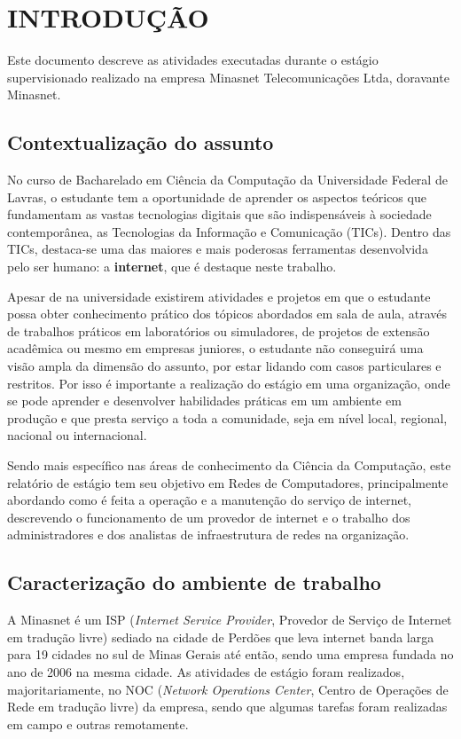 \chapter{INTRODUÇÃO}

    Este documento descreve as atividades executadas durante o estágio supervisionado realizado na empresa Minasnet Telecomunicações Ltda, doravante Minasnet.

\section{Contextualização do assunto}

    No curso de Bacharelado em Ciência da Computação da Universidade Federal de Lavras, o estudante tem a oportunidade de aprender os aspectos teóricos que fundamentam as vastas tecnologias digitais que são indispensáveis à sociedade contemporânea, as Tecnologias da Informação e Comunicação (TICs). Dentro das TICs, destaca-se uma das maiores e mais poderosas ferramentas desenvolvida pelo ser humano: a \textbf{internet}, que é destaque neste trabalho.

    Apesar de na universidade existirem atividades e projetos em que o estudante possa obter conhecimento prático dos tópicos abordados em sala de aula, através de trabalhos práticos em laboratórios ou simuladores, de projetos de extensão acadêmica ou mesmo em empresas juniores, o estudante não conseguirá uma visão ampla da dimensão do assunto, por estar lidando com casos particulares e restritos. Por isso é importante a realização do estágio em uma organização, onde se pode aprender e desenvolver habilidades práticas em um ambiente em produção e que presta serviço a toda a comunidade, seja em nível local, regional, nacional ou internacional.
    
    Sendo mais específico nas áreas de conhecimento da Ciência da Computação, este relatório de estágio tem seu objetivo em Redes de Computadores, principalmente abordando como é feita a operação e a manutenção do serviço de internet, descrevendo o funcionamento de um provedor de internet e o trabalho dos administradores e dos analistas de infraestrutura de redes na organização.

\section{Caracterização do ambiente de trabalho}

    A Minasnet é um ISP (\textit{Internet Service Provider}, Provedor de Serviço de Internet em tradução livre) sediado na cidade de Perdões que leva internet banda larga para 19 cidades no sul de Minas Gerais até então, sendo uma empresa fundada no ano de 2006 na mesma cidade. As atividades de estágio foram realizados, majoritariamente, no NOC (\textit{Network Operations Center}, Centro de Operações de Rede em tradução livre) da empresa, sendo que algumas tarefas foram realizadas em campo e outras remotamente.

